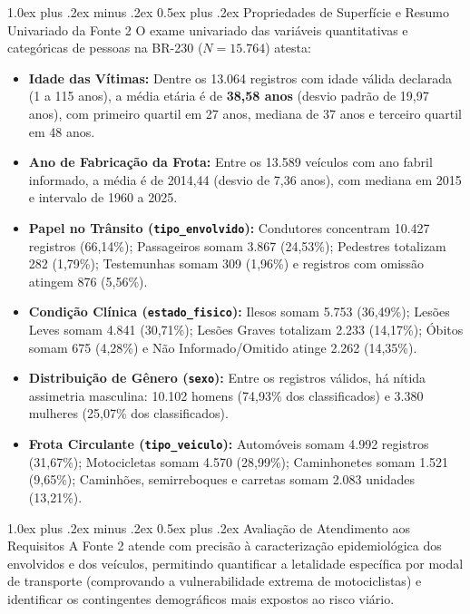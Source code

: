 \documentclass[11pt,a4paper]{article}
\makeatletter
\renewcommand\subsubsection{
\@startsection{subsubsection}{3}{0pt}%
{1.0ex plus .2ex minus .2ex}%
{0.5ex plus .2ex}%
{\normalfont\normalsize\bfseries}
}
\makeatother
\begin{document}
\subsubsection{Propriedades de Superfície e Resumo Univariado da Fonte 2}
O exame univariado das variáveis quantitativas e categóricas de pessoas na BR-230 ($N=15.764$) atesta:
\begin{itemize}
    \item \textbf{Idade das Vítimas:} Dentre os 13.064 registros com idade válida declarada (1 a 115 anos), a média etária é de \textbf{38,58 anos} (desvio padrão de 19,97 anos), com primeiro quartil em 27 anos, mediana de 37 anos e terceiro quartil em 48 anos.
    \item \textbf{Ano de Fabricação da Frota:} Entre os 13.589 veículos com ano fabril informado, a média é de 2014,44 (desvio de 7,36 anos), com mediana em 2015 e intervalo de 1960 a 2025.
    \item \textbf{Papel no Trânsito (\texttt{tipo\_envolvido}):} Condutores concentram 10.427 registros (66,14\%); Passageiros somam 3.867 (24,53\%); Pedestres totalizam 282 (1,79\%); Testemunhas somam 309 (1,96\%) e registros com omissão atingem 876 (5,56\%).
    \item \textbf{Condição Clínica (\texttt{estado\_fisico}):} Ilesos somam 5.753 (36,49\%); Lesões Leves somam 4.841 (30,71\%); Lesões Graves totalizam 2.233 (14,17\%); Óbitos somam 675 (4,28\%) e Não Informado/Omitido atinge 2.262 (14,35\%).
    \item \textbf{Distribuição de Gênero (\texttt{sexo}):} Entre os registros válidos, há nítida assimetria masculina: 10.102 homens (74,93\% dos classificados) e 3.380 mulheres (25,07\% dos classificados).
    \item \textbf{Frota Circulante (\texttt{tipo\_veiculo}):} Automóveis somam 4.992 registros (31,67\%); Motocicletas somam 4.570 (28,99\%); Caminhonetes somam 1.521 (9,65\%); Caminhões, semirreboques e carretas somam 2.083 unidades (13,21\%).
\end{itemize}

\subsubsection{Avaliação de Atendimento aos Requisitos}
A Fonte 2 atende com precisão à caracterização epidemiológica dos envolvidos e dos veículos, permitindo quantificar a letalidade específica por modal de transporte (comprovando a vulnerabilidade extrema de motociclistas) e identificar os contingentes demográficos mais expostos ao risco viário.
\end{document}
